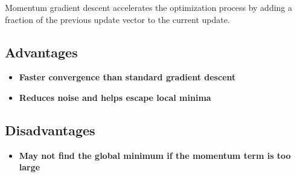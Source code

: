 \documentclass{article}
\begin{document}
Momentum gradient descent accelerates the optimization process by adding a fraction of the previous update vector to the current update.

\subsection{Advantages}

\begin{itemize}
    \item \textbf{Faster convergence than standard gradient descent}
    \item \textbf{Reduces noise and helps escape local minima}
\end{itemize}

\subsection{Disadvantages}

\begin{itemize}
    \item \textbf{May not find the global minimum if the momentum term is too large}
\end{itemize}
\end{document}
